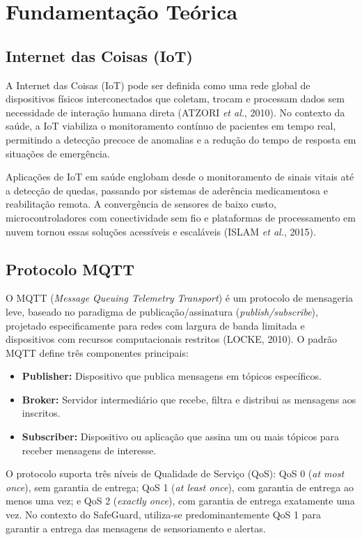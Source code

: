 \documentclass[a4paper,12pt]{article}
\begin{document}
\section{Fundamentação Teórica}

\subsection{Internet das Coisas (IoT)}

A Internet das Coisas (IoT) pode ser definida como uma rede global de dispositivos físicos interconectados que coletam, trocam e processam dados sem necessidade de interação humana direta (ATZORI \textit{et al.}, 2010). No contexto da saúde, a IoT viabiliza o monitoramento contínuo de pacientes em tempo real, permitindo a detecção precoce de anomalias e a redução do tempo de resposta em situações de emergência.

Aplicações de IoT em saúde englobam desde o monitoramento de sinais vitais até a detecção de quedas, passando por sistemas de aderência medicamentosa e reabilitação remota. A convergência de sensores de baixo custo, microcontroladores com conectividade sem fio e plataformas de processamento em nuvem tornou essas soluções acessíveis e escaláveis (ISLAM \textit{et al.}, 2015).

\subsection{Protocolo MQTT}

O MQTT (\textit{Message Queuing Telemetry Transport}) é um protocolo de mensageria leve, baseado no paradigma de publicação/assinatura (\textit{publish/subscribe}), projetado especificamente para redes com largura de banda limitada e dispositivos com recursos computacionais restritos (LOCKE, 2010). O padrão MQTT define três componentes principais:

\begin{itemize}[leftmargin=2cm]
    \item \textbf{Publisher:} Dispositivo que publica mensagens em tópicos específicos.
    \item \textbf{Broker:} Servidor intermediário que recebe, filtra e distribui as mensagens aos inscritos.
    \item \textbf{Subscriber:} Dispositivo ou aplicação que assina um ou mais tópicos para receber mensagens de interesse.
\end{itemize}

O protocolo suporta três níveis de Qualidade de Serviço (QoS): QoS 0 (\textit{at most once}), sem garantia de entrega; QoS 1 (\textit{at least once}), com garantia de entrega ao menos uma vez; e QoS 2 (\textit{exactly once}), com garantia de entrega exatamente uma vez. No contexto do SafeGuard, utiliza-se predominantemente QoS 1 para garantir a entrega das mensagens de sensoriamento e alertas.
\end{document}
